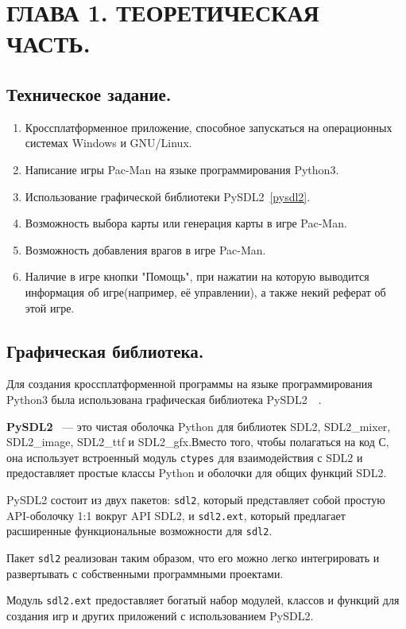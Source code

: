 \chapter{\label{ch:ch01}ГЛАВА 1. ТЕОРЕТИЧЕСКАЯ ЧАСТЬ.}

\section{\label{sec:ch01/sec01}Техническое задание.}
\begin{enumerate}
	\item Кроссплатформенное приложение, способное запускаться на операционных системах Windows и GNU/Linux.
	\item Написание игры Pac-Man на языке программирования Python3.
	\item Использование графической библиотеки PySDL2~\ref{pysdl2}.
	\item Возможность выбора карты или генерация карты в игре Pac-Man.
	\item Возможность добавления врагов в игре Pac-Man.
	\item Наличие в игре кнопки "Помощь", при нажатии на которую выводится информация об игре(например, её управлении), а также некий реферат об этой игре.
\end{enumerate}

\section{\label{sec:ch01/sec02}Графическая библиотека.}
Для создания кроссплатформенной программы на языке программирования Python3 была использована графическая библиотека PySDL2~\cite{pypiRUENpysdl2}~\cite{docENpysdl2}.

\textbf{PySDL2}~\label{pysdl2} --- это чистая оболочка Python для библиотек SDL2, SDL2\_mixer, SDL2\_image, SDL2\_ttf и SDL2\_gfx.Вместо того, чтобы полагаться на код С, она использует
встроенный модуль \texttt{ctypes} для взаимодействия с SDL2 и предоставляет простые классы Python и оболочки для общих функций SDL2.

PySDL2 состоит из двух пакетов: \texttt{sdl2}, который представляет собой простую API-оболочку 1:1 вокруг API SDL2, и \texttt{sdl2.ext}, который предлагает расширенные функциональные возможности для \texttt{sdl2}.

Пакет \texttt{sdl2} реализован таким образом, что его можно легко интегрировать и развертывать с собственными программными проектами.

Модуль \texttt{sdl2.ext} предоставляет богатый набор модулей, классов и функций для создания игр и других приложений с использованием PySDL2.

